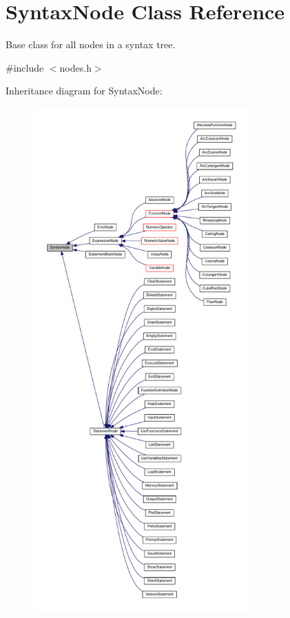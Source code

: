 \hypertarget{classSyntaxNode}{}\section{Syntax\+Node Class Reference}
\label{classSyntaxNode}


Base class for all nodes in a syntax tree.  




{\ttfamily \#include $<$nodes.\+h$>$}



Inheritance diagram for Syntax\+Node\+:\nopagebreak
\begin{figure}[H]
\begin{center}
\leavevmode
\includegraphics[height=550pt]{classSyntaxNode__inherit__graph}
\end{center}
\end{figure}


